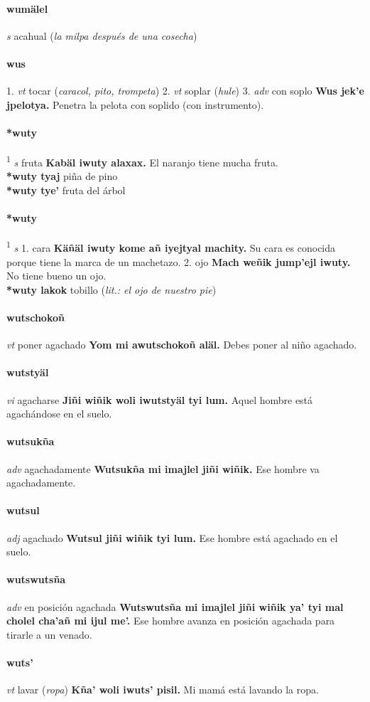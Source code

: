 \documentclass{scrbook}
\newcommand{\entry}[1]{\paragraph{#1}}
\newcommand{\onedefinition}[1]{#1.}
\newcommand{\defsuperscript}[1]{\textsuperscript{1}}
\newcommand{\partofspeech}[1]{\textit{#1}}
\newcommand{\spanishtranslation}[1]{#1}
\newcommand{\clarification}[1]{(\textit{#1})}
\newcommand{\cholexample}[1]{\textbf{#1}}
\newcommand{\exampletranslation}[1]{#1}
\newcommand{\secondaryentry}[1]{\\\textbf{#1}}
\newcommand{\secondtranslation}[1]{#1}
\begin{document}
\begin{multicols}{2}
\entry{wumälel}
\partofspeech{s}
\spanishtranslation{acahual}
\clarification{la milpa después de una cosecha}

\entry{wus}
\onedefinition{1}
\partofspeech{vt}
\spanishtranslation{tocar}
\clarification{caracol, pito, trompeta}
\onedefinition{2}
\partofspeech{vt}
\spanishtranslation{soplar}
\clarification{hule}
\onedefinition{3}
\partofspeech{adv}
\spanishtranslation{con soplo}
\cholexample{Wus jek'e jpelotya.}
\exampletranslation{Penetra la pelota con soplido (con instrumento).}

\entry{*wuty}
\defsuperscript{2}
\partofspeech{s}
\spanishtranslation{fruta}
\cholexample{Kabäl iwuty alaxax.}
\exampletranslation{El naranjo tiene mucha fruta.}
\secondaryentry{*wuty tyaj}
\secondtranslation{piña de pino}
\secondaryentry{*wuty tye'}
\secondtranslation{fruta del árbol}

\entry{*wuty}
\defsuperscript{1}
\partofspeech{s}
\onedefinition{1}
\spanishtranslation{cara}
\cholexample{Käñäl iwuty kome añ iyejtyal machity.}
\exampletranslation{Su cara es conocida porque tiene la marca de un machetazo.}
\onedefinition{2}
\spanishtranslation{ojo}
\cholexample{Mach weñik jump'ejl iwuty.}
\exampletranslation{No tiene bueno un ojo.}
\secondaryentry{*wuty lakok}
\secondtranslation{tobillo}
\clarification{lit.: el ojo de nuestro pie}

\entry{wutschokoñ}
\partofspeech{vt}
\spanishtranslation{poner agachado}
\cholexample{Yom mi awutschokoñ aläl.}
\exampletranslation{Debes poner al niño agachado.}

\entry{wutstyäl}
\partofspeech{vi}
\spanishtranslation{agacharse}
\cholexample{Jiñi wiñik woli iwutstyäl tyi lum.}
\exampletranslation{Aquel hombre está agachándose en el suelo.}

\entry{wutsukña}
\partofspeech{adv}
\spanishtranslation{agachadamente}
\cholexample{Wutsukña mi imajlel jiñi wiñik.}
\exampletranslation{Ese hombre va agachadamente.}

\entry{wutsul}
\partofspeech{adj}
\spanishtranslation{agachado}
\cholexample{Wutsul jiñi wiñik tyi lum.}
\exampletranslation{Ese hombre está agachado en el suelo.}

\entry{wutswutsña}
\partofspeech{adv}
\spanishtranslation{en posición agachada}
\cholexample{Wutswutsña mi imajlel jiñi wiñik ya' tyi mal cholel cha'añ mi ijul me'.}
\exampletranslation{Ese hombre avanza en posición agachada para tirarle a un venado.}

\entry{wuts'}
\partofspeech{vt}
\spanishtranslation{lavar}
\clarification{ropa}
\cholexample{Kña' woli iwuts' pisil.}
\exampletranslation{Mi mamá está lavando la ropa.}


\end{multicols}
\end{document}
